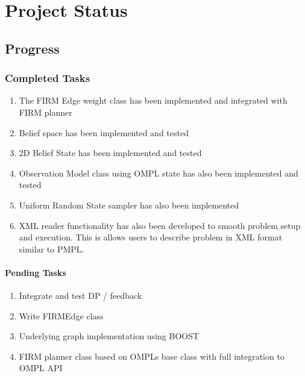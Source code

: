 \chapter{Project Status}

\section{Progress}

\subsection{Completed Tasks}

\begin{enumerate}
 \item The FIRM Edge weight class has been implemented and integrated with FIRM planner
 \item Belief space has been implemented and tested
 \item 2D Belief State has been implemented and tested
 \item Observation Model class using OMPL state has also been implemented and tested
 \item Uniform Random State sampler has also been implemented 
 \item XML reader functionality has also been developed to smooth problem setup and execution. 
	This is allows users to describe problem in XML format similar to PMPL.
\end{enumerate}

\subsubsection{Pending Tasks}
  
\begin{enumerate}
 \item Integrate and test DP /  feedback
 \item Write FIRMEdge class
 \item Underlying graph implementation using BOOST
 \item FIRM planner class based on OMPLs base class with full integration to OMPL API
\end{enumerate}
